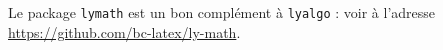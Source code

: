 Le package \verb+lymath+ est un bon complément à \verb+lyalgo+ : voir à l'adresse \url{https://github.com/bc-latex/ly-math}.